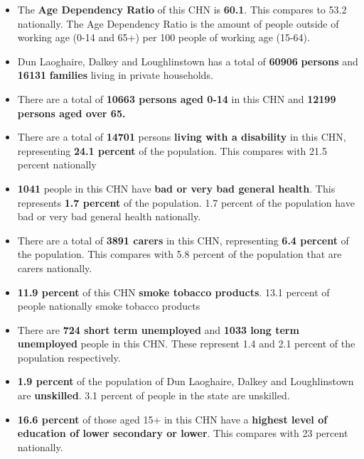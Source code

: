 \documentclass{article}
\begin{document}
\begin{itemize}

\item The \textbf{Age Dependency Ratio} of this CHN is  \textbf{60.1}. This compares to 53.2 nationally. The Age Dependency Ratio is the amount of people outside of working age (0-14 and 65+) per 100 people of working age (15-64). 

\item Dun Laoghaire, Dalkey and Loughlinstown has a total of \textbf{\num{60906}} \textbf{persons} and  \textbf{\num{16131}} \textbf{families} living in private households.

\item There are a total of \textbf{\num{10663} persons aged 0-14} in this CHN and \textbf{\num{12199} persons aged over 65.} 

\item There are a total of \textbf{\num{14701}} persons \textbf{living with a disability} in this CHN, representing \textbf{24.1 percent} of the population. This compares with  21.5 percent nationally

\item \textbf{\num{1041}} people in this CHN have \textbf{bad or very bad general health}. This represents \textbf{1.7 percent} of the population. 1.7 percent of the population have bad or very bad general health nationally. 

\item There are a total of \textbf{\num{3891} carers} in this CHN, representing \textbf{6.4 percent} of the population. This compares with 5.8 percent of the population that are carers nationally. 

\item \textbf{11.9 percent} of this CHN \textbf{smoke tobacco products}. 13.1 percent of people nationally smoke tobacco products

\item There are \textbf{\num{724} short term unemployed} and \textbf{\num{1033} long term unemployed} people in this CHN. These represent 1.4 and 2.1 percent of the population respectively.

\item  \textbf{1.9 percent} of the population of Dun Laoghaire, Dalkey and Loughlinstown are \textbf{unskilled}. 3.1 percent of people in the state are unskilled.

\item \textbf{16.6 percent} of those aged 15+ in this CHN have a \textbf{highest level of education of lower secondary or lower}. This compares with 23 percent nationally. 


\end{itemize}
\end{document}
